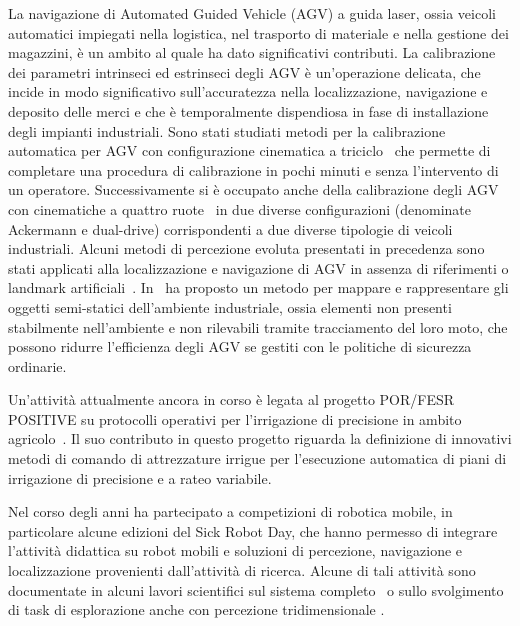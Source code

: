\documentclass[11pt]{article}
\begin{document}
La navigazione di Automated Guided Vehicle (AGV) a guida laser, ossia veicoli automatici impiegati nella logistica, nel trasporto di materiale
e nella gestione dei magazzini, \`e un ambito al quale ha dato significativi contributi. 
La calibrazione dei parametri intrinseci ed estrinseci degli AGV \`e un'operazione delicata, che incide in modo significativo sull'accuratezza nella localizzazione,  navigazione e deposito delle merci e che \`e temporalmente dispendiosa in fase di installazione degli impianti industriali. 
Sono stati studiati metodi per la calibrazione automatica per AGV con configurazione cinematica a triciclo~\cite{kallasi2017ras}
che permette di completare una procedura di calibrazione in pochi minuti e senza l'intervento di un operatore. 
Successivamente si \`e occupato anche della calibrazione degli AGV con cinematiche a quattro ruote~\cite{galasso2019rcim} in due diverse configurazioni (denominate Ackermann e dual-drive) corrispondenti a due diverse tipologie di veicoli industriali. 
Alcuni metodi di percezione evoluta presentati in precedenza sono stati applicati alla localizzazione e navigazione di AGV in assenza di riferimenti o landmark artificiali~\cite{galasso2020sensors}. 
In~\cite{lodirizzini2007icinco} ha proposto un metodo per mappare e rappresentare gli oggetti semi-statici dell'ambiente industriale, ossia elementi non presenti stabilmente 
nell'ambiente e non rilevabili tramite tracciamento del loro moto, che possono ridurre l'efficienza degli AGV se gestiti con le politiche di sicurezza ordinarie. 

Un'attivit\`a attualmente ancora in corso \`e legata al progetto POR/FESR POSITIVE su protocolli operativi per l'irrigazione di precisione in ambito agricolo~\cite{amoretti2020smartsys}. 
Il suo contributo in questo progetto riguarda la definizione di innovativi metodi di comando di attrezzature irrigue per l'esecuzione automatica di piani di irrigazione di precisione e a rateo variabile. 

Nel corso degli anni ha partecipato a competizioni di robotica mobile, in particolare alcune edizioni del Sick Robot Day, che hanno permesso di integrare l'attivit\`a didattica su robot mobili e soluzioni di percezione, navigazione e localizzazione provenienti dall'attivit\`a di ricerca. 
Alcune di tali attivit\`a sono documentate in alcuni lavori scientifici sul sistema completo~\cite{cigolini2014jamris} o sullo svolgimento di task di esplorazione anche con percezione tridimensionale \cite{valeriani2013acra}. 
\end{document}
